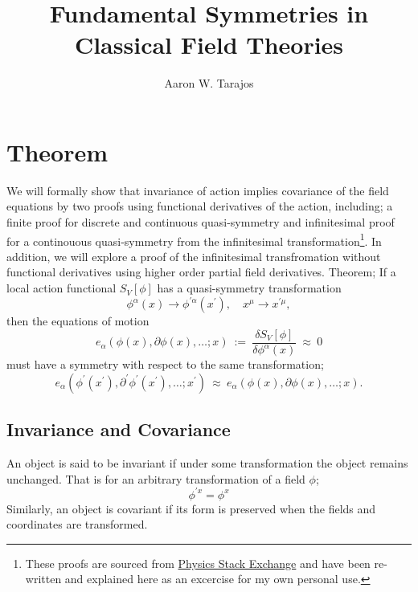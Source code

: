\documentclass{article}
\title{Fundamental Symmetries in Classical Field Theories}
\author{Aaron W. Tarajos}
\begin{document}
\maketitle

\section{Theorem}
We will formally show that invariance of action implies covariance of the field equations by two proofs using functional derivatives of the action, including; a finite proof for discrete and continuous quasi-symmetry and infinitesimal proof for a continouous quasi-symmetry from the infinitesimal transformation\footnote{These proofs are sourced from \href{https://physics.stackexchange.com/questions/144389/invariance-of-action-rightarrow-covariance-of-field-equations}{Physics Stack Exchange} and have been re-written and explained here as an excercise for my own personal use.}.
In addition, we will explore a proof of the infinitesimal transfromation without functional derivatives using higher order partial field derivatives. Theorem;
If a local action functional $S_V\left[\phi\right]$ has a quasi-symmetry transformation
\begin{equation}
	\phi^\alpha (x) \to \phi^{\prime\alpha}(x^\prime), \quad x^\mu \to x^{\prime\mu},
\end{equation}
then the equations of motion
\begin{equation}
	e_{\alpha}(\phi(x),\partial\phi(x),\ldots ; x)~:=~\frac{\delta S_V[\phi]}{\delta \phi^{\alpha}(x)}~\approx~0
\end{equation}
must have a symmetry with respect to the same transformation;
\begin{equation}
	e_{\alpha}(\phi^{\prime}(x^{\prime}),\partial^{\prime}\phi^{\prime}(x^{\prime}),\ldots ; x^{\prime})~\approx~e_{\alpha}(\phi(x),\partial\phi(x),\ldots ; x).
\end{equation}

\subsection{Invariance and Covariance}
An object is said to be invariant if under some transformation the object remains unchanged. That is for an arbitrary transformation of a field $\phi$;
\[
	\phi^{\prime x}  = \phi^x
\]
Similarly, an object is covariant if its form is preserved when the fields and coordinates are transformed.
\end{document}

